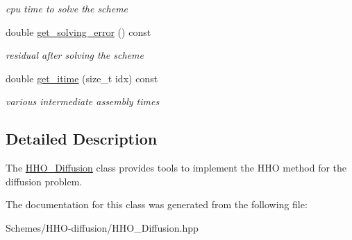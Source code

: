 \begin{DoxyCompactItemize}
\begin{DoxyCompactList}\small\item\em cpu time to solve the scheme \end{DoxyCompactList}\item 
double \hyperlink{group__HHO__Diffusion_ga91b1ec7d73685c4a1d49d671b4b69814}{get\+\_\+solving\+\_\+error} () const
\begin{DoxyCompactList}\small\item\em residual after solving the scheme \end{DoxyCompactList}\item 
double \hyperlink{group__HHO__Diffusion_ga00b3b186fb915242a805c7c53e323e6e}{get\+\_\+itime} (size\+\_\+t idx) const
\begin{DoxyCompactList}\small\item\em various intermediate assembly times \end{DoxyCompactList}\end{DoxyCompactItemize}


\subsection{Detailed Description}
The \hyperlink{classHArDCore3D_1_1HHO__Diffusion}{H\+H\+O\+\_\+\+Diffusion} class provides tools to implement the H\+HO method for the diffusion problem. 

The documentation for this class was generated from the following file\+:\begin{DoxyCompactItemize}
\item 
Schemes/\+H\+H\+O-\/diffusion/H\+H\+O\+\_\+\+Diffusion.\+hpp\end{DoxyCompactItemize}
